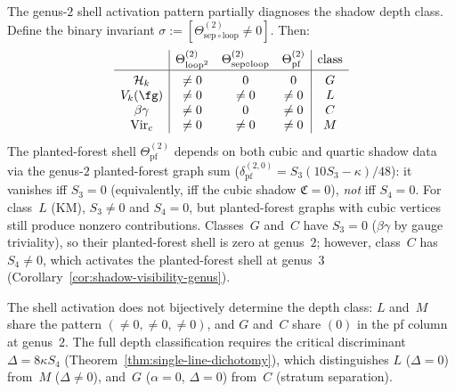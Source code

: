 \begin{theorem}
\label{rem:genus2-shell-activation}
The genus-$2$ shell activation pattern partially diagnoses the
shadow depth class.  Define the binary invariant
$\sigma := [\Theta^{(2)}_{\mathrm{sep}\circ\mathrm{loop}} \neq 0]$.
Then:
\[
\begin{array}{c|ccc|c}
& \Theta^{(2)}_{\mathrm{loop}^2}
& \Theta^{(2)}_{\mathrm{sep}\circ\mathrm{loop}}
& \Theta^{(2)}_{\mathrm{pf}}
& \text{class}
\\[2pt]\hline
\rule{0pt}{11pt}
\mathcal{H}_k & \neq 0 & 0 & 0 & G \\
V_k(\fg) & \neq 0 & \neq 0 & \neq 0 & L \\
\beta\gamma & \neq 0 & 0 & \neq 0 & C \\
\mathrm{Vir}_c & \neq 0 & \neq 0 & \neq 0 & M
\end{array}
\]
The planted-forest shell $\Theta^{(2)}_{\mathrm{pf}}$ depends on
both cubic and quartic shadow data via the genus-$2$ planted-forest
graph sum \textup{(}$\delta_{\mathrm{pf}}^{(2,0)} =
S_3(10S_3 - \kappa)/48$\textup{)}: it vanishes iff
$S_3 = 0$ \textup{(}equivalently, iff the cubic shadow
$\mathfrak{C} = 0$\textup{)}, \emph{not} iff
$S_4 = 0$.  For class~$L$ \textup{(}KM\textup{)},
$S_3 \neq 0$ and $S_4 = 0$, but planted-forest graphs with
cubic vertices still produce nonzero contributions.
Classes~$G$ and~$C$ have $S_3 = 0$ \textup{(}$\beta\gamma$
by gauge triviality\textup{)}, so their planted-forest shell is
zero at genus~$2$; however, class~$C$ has $S_4 \neq 0$, which
activates the planted-forest shell at genus~$3$
\textup{(}Corollary~\textup{\ref{cor:shadow-visibility-genus}}\textup{)}.

The shell activation does not bijectively determine the depth class:
$L$ and~$M$ share the pattern $(\neq 0, \neq 0, \neq 0)$, and
$G$ and~$C$ share $(0)$ in the pf column at genus~$2$.
The full depth classification requires the critical discriminant
$\Delta = 8\kappa S_4$
\textup{(}Theorem~\textup{\ref{thm:single-line-dichotomy}}\textup{)},
which distinguishes $L$ \textup{(}$\Delta = 0$\textup{)} from~$M$
\textup{(}$\Delta \neq 0$\textup{)}, and~$G$ \textup{(}$\alpha = 0$,
$\Delta = 0$\textup{)} from~$C$
\textup{(}stratum separation\textup{)}.
\end{theorem}

